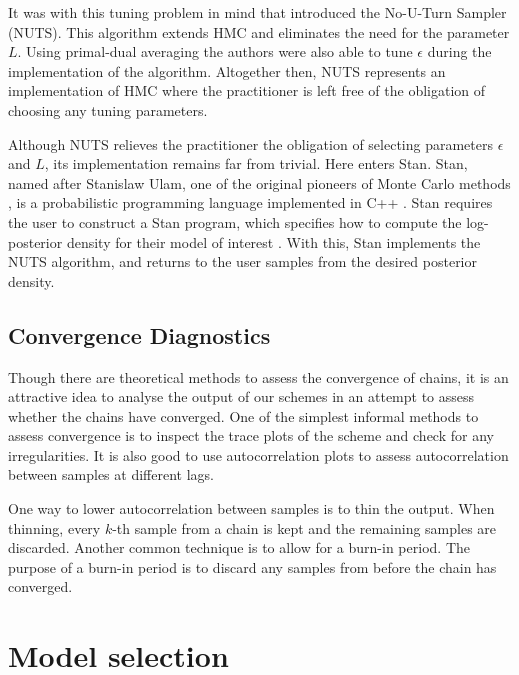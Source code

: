 It was with this tuning problem in mind that \textcite{hoffman14} introduced the No-U-Turn
Sampler (NUTS). This algorithm extends HMC and eliminates the need for the parameter $L$.
Using primal-dual averaging the authors were also able to tune $\epsilon$ during the
implementation of the algorithm. Altogether then, NUTS represents an implementation of HMC
where the practitioner is left free of the obligation of choosing any tuning parameters.

Although NUTS relieves the practitioner the obligation of selecting parameters $\epsilon$
and $L$, its implementation remains far from trivial. Here enters Stan. Stan, named after
Stanislaw Ulam, one of the original pioneers of Monte Carlo methods
\parencite{metropolis49}, is a probabilistic programming language implemented in C++
\parencite{gelman15}. Stan requires the user to construct a Stan program, which specifies
how to compute the log-posterior density for their model of interest
\parencite{stanteam15}. With this, Stan implements the NUTS algorithm, and returns to the
user samples from the desired posterior density.

\subsection{Convergence Diagnostics}
\label{ssec:convergence_diagnostics}

Though there are theoretical methods to assess the convergence of chains, it is an attractive idea to
analyse the output of our schemes in an attempt to assess whether the chains have converged. One of
the simplest informal methods to assess convergence is to inspect the trace plots of the scheme and
check for any irregularities. It is also good to use autocorrelation plots to assess autocorrelation
between samples at different lags.

One way to lower autocorrelation between samples is to thin the output. When thinning, every $k$-th
sample from a chain is kept and the remaining samples are discarded. Another common technique is to
allow for a burn-in period. The purpose of a burn-in period is to discard any samples from before the
chain has converged.

\section{Model selection}
\label{sec:model_comparison}

